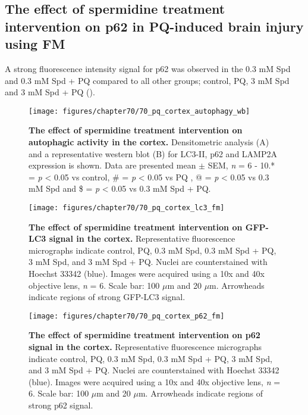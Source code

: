 \subsection{The effect of spermidine treatment intervention on p62 in PQ-induced brain injury using FM}
A strong fluorescence intensity signal for p62 was observed in the 0.3 mM Spd and 0.3 mM Spd + PQ compared to all other groups; control, PQ, 3 mM Spd and 3 mM Spd + PQ ().

\begin{landscape}
\begin{figure}[!htbp]
\center
  \texttt{[image: figures/chapter70/70\_pq\_cortex\_autophagy\_wb]}
  \caption[The effect of spermidine treatment intervention on autophagic activity in the cortex]{\textbf{The effect of spermidine treatment intervention on autophagic activity in the cortex.} Densitometric analysis (A) and a representative western blot (B) for LC3-II, p62 and LAMP2A expression is shown. Data are presented  mean $\pm$ SEM, \textit{n} = 6 - 10.* = \textit{p} < 0.05 vs control, \# = \textit{p} < 0.05 vs PQ , @ = \textit{p} < 0.05 vs 0.3 mM Spd and \$ = \textit{p} < 0.05 vs 0.3 mM Spd + PQ.}
  \label{fig:70_pq_cortex_autophagy_wb}
\end{figure} 
\end{landscape}

\begin{landscape}
\begin{figure}[!htbp]
\center
  \texttt{[image: figures/chapter70/70\_pq\_cortex\_lc3\_fm]}
  \caption[The effect of spermidine treatment intervention on GFP-LC3 signal in the cortex]{\textbf{The effect of spermidine treatment intervention on GFP-LC3 signal in the cortex.} Representative fluorescence micrographs indicate control, PQ, 0.3 mM Spd, 0.3 mM Spd + PQ, 3 mM Spd, and 3 mM Spd + PQ. Nuclei are counterstained with Hoechst 33342 (blue). Images were acquired using a 10x and 40x objective lens, \textit{n} = 6. Scale bar: 100 $\mu$m and 20 $\mu$m. Arrowheads indicate regions of strong GFP-LC3 signal.}
  \label{fig:70_pq_cortex_lc3_fm}
\end{figure} 
\end{landscape}

\begin{landscape}
\begin{figure}[!htbp]
\center
  \texttt{[image: figures/chapter70/70\_pq\_cortex\_p62\_fm]}
  \caption[The effect of spermidine treatment intervention on p62 signal in the cortex]{\textbf{The effect of spermidine treatment intervention on p62 signal in the cortex.} Representative fluorescence micrographs indicate control, PQ, 0.3 mM Spd, 0.3 mM Spd + PQ, 3 mM Spd, and 3 mM Spd + PQ. Nuclei are counterstained with Hoechst 33342 (blue). Images were acquired using a 10x and 40x objective lens, \textit{n} = 6. Scale bar: 100 $\mu$m and 20 $\mu$m. Arrowheads indicate regions of strong p62 signal.}
  \label{fig:70_pq_cortex_p62_fm}
\end{figure} 
\end{landscape}

